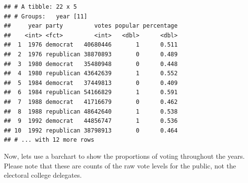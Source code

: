 \documentclass[
]{article}
\newenvironment{Shaded}{\begin{snugshade}}{\end{snugshade}}
\newcommand{\DataTypeTok}[1]{\textcolor[rgb]{0.13,0.29,0.53}{#1}}
\newcommand{\DecValTok}[1]{\textcolor[rgb]{0.00,0.00,0.81}{#1}}
\newcommand{\KeywordTok}[1]{\textcolor[rgb]{0.13,0.29,0.53}{\textbf{#1}}}
\newcommand{\NormalTok}[1]{#1}
\newcommand{\OperatorTok}[1]{\textcolor[rgb]{0.81,0.36,0.00}{\textbf{#1}}}
\newcommand{\OtherTok}[1]{\textcolor[rgb]{0.56,0.35,0.01}{#1}}
\newcommand{\StringTok}[1]{\textcolor[rgb]{0.31,0.60,0.02}{#1}}
\begin{document}
\begin{Shaded}
\end{Shaded}

\begin{verbatim}
## # A tibble: 22 x 5
## # Groups:   year [11]
##     year party         votes popular percentage
##    <int> <fct>         <int>   <dbl>      <dbl>
##  1  1976 democrat   40680446       1      0.511
##  2  1976 republican 38870893       0      0.489
##  3  1980 democrat   35480948       0      0.448
##  4  1980 republican 43642639       1      0.552
##  5  1984 democrat   37449813       0      0.409
##  6  1984 republican 54166829       1      0.591
##  7  1988 democrat   41716679       0      0.462
##  8  1988 republican 48642640       1      0.538
##  9  1992 democrat   44856747       1      0.536
## 10  1992 republican 38798913       0      0.464
## # ... with 12 more rows
\end{verbatim}

Now, lets use a barchart to show the proportions of voting throughout
the years. Please note that these are counts of the raw vote levels for
the public, not the electoral college delegates.
\end{document}
